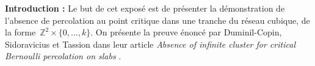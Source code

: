 \vspace*{0.3cm}
\begin{center}
\begin{minipage}{0.85\textwidth}
	\textbf{Introduction :}
	Le but de cet exposé est de présenter la démonstration de l'absence de percolation au point critique dans une tranche du réseau cubique, de la forme~$\mathbb{Z}^2\times\{0,...,k\}$. On présente la preuve énoncé par Duminil-Copin, Sidoravicius et Tassion dans leur article \emph{Absence of infinite cluster for critical Bernoulli percolation on slabs} \cite{main}.
\end{minipage}
\end{center}